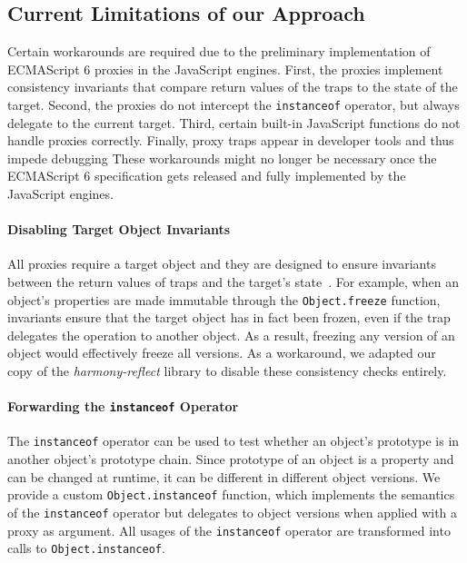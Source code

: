 \documentclass{sigplanconf}
\begin{document}
\subsection{Current Limitations of our Approach} \label{sec:IMPLEMENTATION:4}

Certain workarounds are required due to the preliminary implementation of ECMAScript 6 proxies in the JavaScript engines.
First, the proxies implement consistency invariants that compare return values of the traps to the state of the target.
Second, the proxies do not intercept the \lstinline{instanceof} operator, but always delegate to the current target.
Third, certain built-in JavaScript functions do not handle proxies correctly.
Finally, proxy traps appear in developer tools and thus impede debugging
These workarounds might no longer be necessary once the ECMAScript 6 specification gets released and fully implemented by the JavaScript engines.

\paragraph{Disabling Target Object Invariants}
All proxies require a target object and they are designed to ensure invariants between the return values of traps and the target's state~\cite{Cutsem2013TRP}.
For example, when an object's properties are made immutable through the \lstinline{Object.freeze} function, invariants ensure that the target object has in fact been frozen, even if the trap delegates the operation to another object.
As a result, freezing any version of an object would effectively freeze all versions.
As a workaround, we adapted our copy of the \emph{harmony-reflect} library to disable these consistency checks entirely.

\paragraph{Forwarding the \lstinline{instanceof} Operator}
The \lstinline{instanceof} operator can be used to test whether an object's prototype is in another object's prototype chain.
Since prototype of an object is a property and can be changed at runtime, it can be different in different object versions.
We provide a custom \lstinline{Object.instanceof} function, which implements the semantics of the \lstinline{instanceof} operator but delegates to object versions when applied with a proxy as argument.
All usages of the \lstinline{instanceof} operator are transformed into calls to \lstinline{Object.instanceof}.
\end{document}
